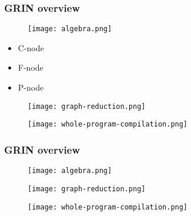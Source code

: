 \documentclass[bigger,aspectratio=169]{beamer}
\begin{document}
\begin{frame}[fragile]
\frametitle{GRIN overview}
\begin{center}

	\begin{minipage}{0.30\textwidth}
		\vspace{1cm}
		\begin{figure}
			\texttt{[image: algebra.png]}
		\end{figure}
		\vspace{-0.5cm}
		\begin{itemize}
			\item<1-> C-node
			\item<2-> F-node
			\item<3-> P-node
		\end{itemize}
	\end{minipage}
	\hfill
	\begin{minipage}{0.30\textwidth}
		\begin{figure}
			\texttt{[image: graph-reduction.png]}
		\end{figure}
	\end{minipage}
	\hfill
	\begin{minipage}{0.30\textwidth}
		\begin{figure}
			\texttt{[image: whole-program-compilation.png]}
		\end{figure}
	\end{minipage}

\end{center}
\end{frame}


\begin{frame}[fragile]
\frametitle{GRIN overview}
\begin{center}

	\begin{minipage}{0.30\textwidth}
		\begin{figure}
			\texttt{[image: algebra.png]}
		\end{figure}
	\end{minipage}
	\hfill
	\begin{minipage}{0.30\textwidth}
		\begin{figure}
			\texttt{[image: graph-reduction.png]}
		\end{figure}
	\end{minipage}
	\hfill
	\begin{minipage}{0.30\textwidth}
		\begin{figure}
			\texttt{[image: whole-program-compilation.png]}
		\end{figure}
	\end{minipage}

\end{center}
\end{frame}
\end{document}
